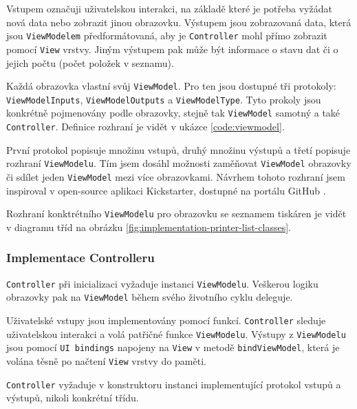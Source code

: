 Vstupem označuji uživatelskou interakci, na základě které je potřeba vyžádat nová data nebo zobrazit jinou obrazovku.
Výstupem jsou zobrazovaná data, která jsou \texttt{ViewModelem} předformátovaná, aby je \texttt{Controller} mohl přímo zobrazit pomocí \texttt{View} vrstvy.
Jiným výstupem pak může být informace o stavu dat či o jejich počtu (počet položek v seznamu).

Každá obrazovka vlastní svůj \texttt{ViewModel}.
Pro ten jsou dostupné tři protokoly: \texttt{ViewModelInputs}, \texttt{ViewModelOutputs} a \texttt{ViewModelType}.
Tyto prokoly jsou konkrétně pojmenovány podle obrazovky, stejně tak \texttt{ViewModel} samotný a také \texttt{Controller}.
Definice rozhraní je vidět v ukázce \ref{code:viewmodel}.


První protokol popisuje množinu vstupů, druhý množinu výstupů a třetí popisuje rozhraní \texttt{ViewModelu}.
Tím jsem dosáhl možnosti zaměňovat \texttt{ViewModel} obrazovky či sdílet jeden \texttt{ViewModel} mezi více obrazovkami.
Návrhem tohoto rozhraní jsem inspiroval v open-source aplikaci Kickstarter, dostupné na portálu GitHub \cite{github-kickstarter}.

Rozhraní konktrétního \texttt{ViewModelu} pro obrazovku se seznamem tiskáren je vidět v diagramu tříd na obrázku \ref{fig:implementation-printer-list-classes}.


\subsubsection*{Implementace Controlleru}

\texttt{Controller} při inicializaci vyžaduje instanci \texttt{ViewModelu}.
Veškerou logiku obrazovky pak na \texttt{ViewModel} během svého životního cyklu deleguje.

Uživatelské vstupy jsou implementovány pomocí funkcí.
\texttt{Controller} sleduje uživatelskou interakci a volá patřičné funkce \texttt{ViewModelu}.
Výstupy z \texttt{ViewModelu} jsou pomocí \texttt{UI bindings} napojeny na \texttt{View} v metodě \texttt{bindViewModel}, která je volána těsně po načtení \texttt{View} vrstvy do paměti.

\texttt{Controller} vyžaduje v konstruktoru instanci implementující protokol vstupů a výstupů, nikoli konkrétní třídu.


